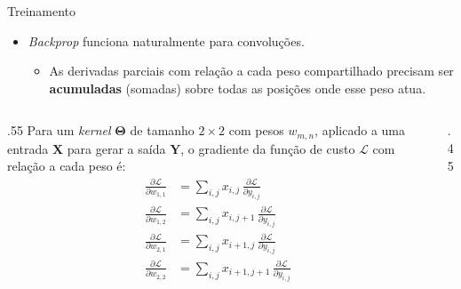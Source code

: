 \documentclass[aspectratio=169,xcolor=dvipsnames]{beamer}
\begin{document}
\begin{frame}{Treinamento}
\begin{itemize}
    \item \textit{Backprop} funciona naturalmente para convoluções.
    \begin{itemize}
        \item As derivadas parciais com relação a cada peso compartilhado precisam ser \textbf{acumuladas} (somadas) sobre todas as posições onde esse peso atua.
    \end{itemize}
\end{itemize}
\vspace{0.4em}
\begin{columns}
    \begin{column}{.55\linewidth}
        \footnotesize
        Para um \textit{kernel} $\mathbf{\Theta}$ de tamanho $2\times 2$ com pesos $w_{m,n}$, aplicado a uma entrada $\mathbf{X}$ para gerar a saída $\mathbf{Y}$, o gradiente da função de custo $\mathcal{L}$ com relação a cada peso é:
        \begin{align*}
            \frac{\partial \mathcal{L}}{\partial w_{1,1}} &= \sum_{i,j} x_{i,j}\,\frac{\partial \mathcal{L}}{\partial y_{i,j}}\\
            \frac{\partial \mathcal{L}}{\partial w_{1,2}} &= \sum_{i,j} x_{i,j+1}\,\frac{\partial \mathcal{L}}{\partial y_{i,j}}\\
            \frac{\partial \mathcal{L}}{\partial w_{2,1}} &= \sum_{i,j} x_{i+1,j}\,\frac{\partial \mathcal{L}}{\partial y_{i,j}}\\
            \frac{\partial \mathcal{L}}{\partial w_{2,2}} &= \sum_{i,j} x_{i+1,j+1}\,\frac{\partial \mathcal{L}}{\partial y_{i,j}}
        \end{align*}
    \end{column}
    \begin{column}{.45\linewidth}
        \centering
    \end{column}
\end{columns}
\end{frame}
\end{document}
